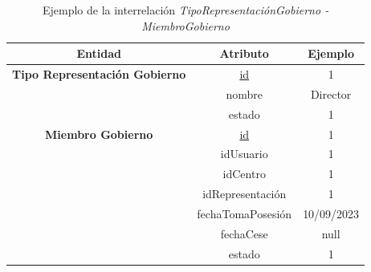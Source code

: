 \begin{itemize}
    \begin{table}[H]
    \centering
        \begin{tabular}{ | c | c | c |  }
             \hline
                 \textbf{Entidad} & \textbf{Atributo} & \textbf{Ejemplo}\\       
             \hline
                 \textbf{Tipo Representación Gobierno}  & \underline{id} & 1\\
                  & nombre & Director\\
                  & estado & 1\\
             \hline
                 \textbf{Miembro Gobierno}  & \underline{id} & 1\\
                  & idUsuario & 1\\
                  & idCentro & 1\\
                  & idRepresentación & 1\\
                  & fechaTomaPosesión & 10/09/2023\\
                  & fechaCese & null\\
                  & estado & 1\\
        \end{tabular}
        \caption{Ejemplo de la interrelación \textit{TipoRepresentaciónGobierno - MiembroGobierno}}
        \label{table:I-TipGob-MiGob}
    \end{table}
\end{itemize}


